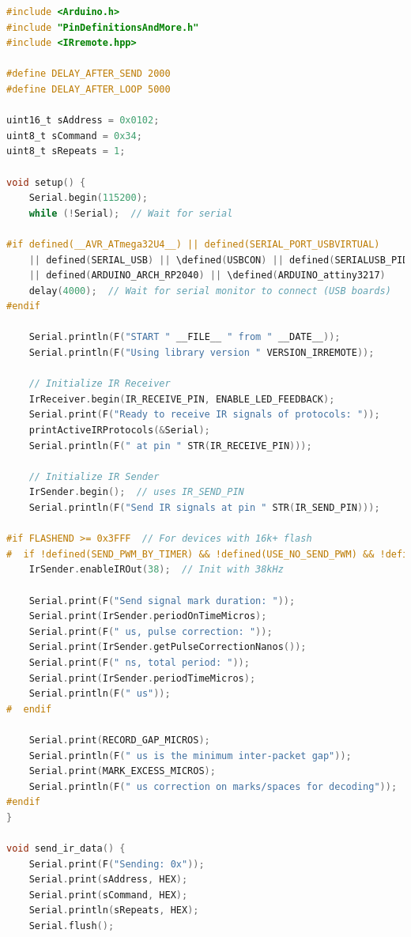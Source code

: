 \documentclass{article}
\begin{document}
\begin{lstlisting}[language=C, basicstyle=\ttfamily\footnotesize, frame=single, xleftmargin=10mm, xrightmargin=10mm]
#include <Arduino.h>
#include "PinDefinitionsAndMore.h"
#include <IRremote.hpp>

#define DELAY_AFTER_SEND 2000
#define DELAY_AFTER_LOOP 5000

uint16_t sAddress = 0x0102;
uint8_t sCommand = 0x34;
uint8_t sRepeats = 1;

void setup() {
    Serial.begin(115200);
    while (!Serial);  // Wait for serial

#if defined(__AVR_ATmega32U4__) || defined(SERIAL_PORT_USBVIRTUAL) 
    || defined(SERIAL_USB) || \defined(USBCON) || defined(SERIALUSB_PID) 
    || defined(ARDUINO_ARCH_RP2040) || \defined(ARDUINO_attiny3217)
    delay(4000);  // Wait for serial monitor to connect (USB boards)
#endif

    Serial.println(F("START " __FILE__ " from " __DATE__));
    Serial.println(F("Using library version " VERSION_IRREMOTE));

    // Initialize IR Receiver
    IrReceiver.begin(IR_RECEIVE_PIN, ENABLE_LED_FEEDBACK);
    Serial.print(F("Ready to receive IR signals of protocols: "));
    printActiveIRProtocols(&Serial);
    Serial.println(F(" at pin " STR(IR_RECEIVE_PIN)));

    // Initialize IR Sender
    IrSender.begin();  // uses IR_SEND_PIN
    Serial.println(F("Send IR signals at pin " STR(IR_SEND_PIN)));

#if FLASHEND >= 0x3FFF  // For devices with 16k+ flash
#  if !defined(SEND_PWM_BY_TIMER) && !defined(USE_NO_SEND_PWM) && !defined(ESP32)
    IrSender.enableIROut(38);  // Init with 38kHz

    Serial.print(F("Send signal mark duration: "));
    Serial.print(IrSender.periodOnTimeMicros);
    Serial.print(F(" us, pulse correction: "));
    Serial.print(IrSender.getPulseCorrectionNanos());
    Serial.print(F(" ns, total period: "));
    Serial.print(IrSender.periodTimeMicros);
    Serial.println(F(" us"));
#  endif

    Serial.print(RECORD_GAP_MICROS);
    Serial.println(F(" us is the minimum inter-packet gap"));
    Serial.print(MARK_EXCESS_MICROS);
    Serial.println(F(" us correction on marks/spaces for decoding"));
#endif
}

void send_ir_data() {
    Serial.print(F("Sending: 0x"));
    Serial.print(sAddress, HEX);
    Serial.print(sCommand, HEX);
    Serial.println(sRepeats, HEX);
    Serial.flush();


\end{lstlisting}
\end{document}
